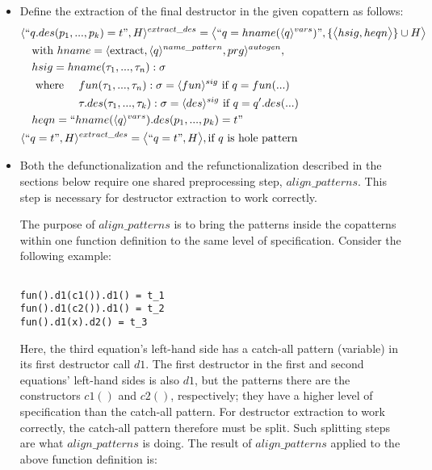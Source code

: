 \documentclass[11pt]{article} %
\begin{document}
\begin{itemize}
\item Define the extraction of the final destructor in the given copattern as follows:
\begin{alignat*}{2}
& \langle `` q.des(p_1, ..., p_k) = t ", H \rangle^{extract\_des} = \big\langle `` q = hname(\langle q \rangle^{vars})  ", \{ \big\langle hsig, heqn \big\rangle \} \cup H \big\rangle \span\span \\
&\quad \textrm{with } hname = \langle \textrm{extract}, \langle q \rangle^{name\_pattern}, prg \rangle^{autogen}, \span\span \\
&\quad hsig = hname(\tau_1, ..., \tau_n): \sigma \span\span \\
&\quad \textrm{ where } && fun(\tau_1, ..., \tau_n): \sigma = \langle fun \rangle^{sig} \textrm{ if } q = fun(...)\\
&\quad && \tau.des(\tau_1, ..., \tau_k) : \sigma = \langle des \rangle^{sig} \textrm{ if } q = q'.des(...) \\
&\quad heqn = `` hname(\langle q \rangle^{vars}).des(p_1, ..., p_k) = t  " \span\span \\
& \langle `` q = t ", H \rangle^{extract\_des} = \big\langle `` q = t ", H \big\rangle, \textrm{if $q$ is hole pattern} \span\span
\end{alignat*}

\item Both the defunctionalization and the refunctionalization described in the sections below require one shared preprocessing step, $align\_patterns$. This step is necessary for destructor extraction to work correctly.

The purpose of $align\_patterns$ is to bring the patterns inside the copatterns within one function definition to the same level of specification. Consider the following example:

\begin{lstlisting}

fun().d1(c1()).d1() = t_1
fun().d1(c2()).d1() = t_2
fun().d1(x).d2() = t_3

\end{lstlisting}

Here, the third equation's left-hand side has a catch-all pattern (variable) in its first destructor call $d1$. The first destructor in the first and second equations' left-hand sides is also $d1$, but the patterns there are the constructors $c1()$ and $c2()$, respectively; they have a higher level of specification than the catch-all pattern. For destructor extraction to work correctly, the catch-all pattern therefore must be split. Such splitting steps are what $align\_patterns$ is doing. The result of $align\_patterns$ applied to the above function definition is:


\end{itemize}
\end{document}

